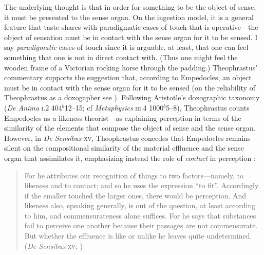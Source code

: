 
The underlying thought is that in order for something to be the object of sense, it must be presented to the sense organ. On the ingestion model, it is a general feature that taste shares with paradigmatic cases of touch that is operative---the object of sensation must be in contact with the sense organ for it to be sensed. I say \emph{paradigmatic} cases of touch since it is arguable, at least, that one can feel something that one is not in direct contact with. (Thus one might feel the wooden frame of a Victorian rocking horse through the padding.) Theophrastus' commentary supports the suggestion that, according to Empedocles, an object must be in contact with the sense organ for it to be sensed (on the reliability of Theophrastus as a doxogapher see \citealt{Kahn:1994qf}). Following Aristotle's doxographic taxonomy (\emph{De Anima} \textsc{i}.2 404\( ^{b} \)12--15; cf \emph{Metaphysics} \textsc{iii}.4 1000\( ^{b} \)5--8), Theophrastus counts Empedocles as a likeness theorist---as explaining perception in terms of the similarity of the elements that compose the object of sense and the sense organ. However, in \emph{De Sensibus} \textsc{xv}, Theophrastus concedes that Empedocles remains silent on the compositional similarity of the material effluence and the sense organ that assimilates it, emphasizing instead the role of \emph{contact} in perception \citep{Kamtekar:2009fk,Sedley:1992uq}:
\begin{quote}
	For he attributes our recognition of things to two factors---namely, to likeness and to contact; and so he uses the expression ``to fit''. Accordingly if the smaller touched the larger ones, there would be perception. And likeness also, speaking generally, is out of the question, at least according to him, and commensurateness alone suffices. For he says that substances fail to perceive one another because their passages are not commensurate. But whether the effluence is like or unlike he leaves quite undetermined. (\emph{De Sensibus} \textsc{xv}; \citealt[79]{Stratton:1917vn})
\end{quote}

